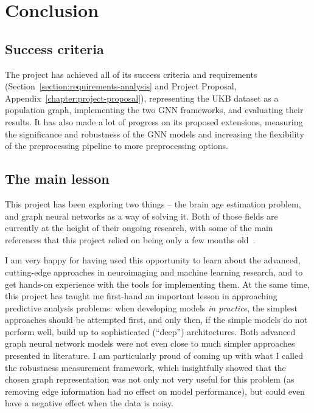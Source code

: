 \chapter{Conclusion}



\section{Success criteria}
The project has achieved all of its success criteria and requirements (Section~\ref{section:requirements-analysis} and Project Proposal, Appendix~\ref{chapter:project-proposal}), representing the UKB dataset as a population graph, implementing the two GNN frameworks, and evaluating their results. It has also made a lot of progress on its proposed extensions, measuring the significance and robustness of the GNN models and increasing the flexibility of the preprocessing pipeline to more preprocessing options.

\section{The main lesson}
This project has been exploring two things – the brain age estimation problem, and graph neural networks as a way of solving it. Both of those fields are currently at the height of their ongoing research, with some of the main references that this project relied on being only a few months old~\cite{kaufmann2019, niu2019improved, pervaiz2020optimising}.

I am very happy for having used this opportunity to learn about the advanced, cutting-edge approaches in neuroimaging and machine learning research, and to get hands-on experience with the tools for implementing them. At the same time, this project has taught me first-hand an important lesson in approaching predictive analysis problems: when developing models \textit{in practice}, the simplest approaches should be attempted first, and only then, if the simple models do not perform well, build up to sophisticated (``deep'') architectures. Both advanced graph neural network models were not even close to much simpler approaches presented in literature. I am particularly proud of coming up with what I called the robustness measurement framework, which insightfully showed that the chosen graph representation was not only not very useful for this problem (as removing edge information had no effect on model performance), but could even have a negative effect when the data is noisy.


